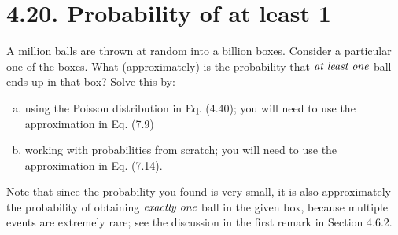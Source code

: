\section*{4.20. Probability of at least 1}
A million balls are thrown at random into a billion boxes.
Consider a particular one of the boxes. What (approximately)
is the probability that $\emph{at least one}$ ball ends
up in that box? Solve this by:
\begin{enumerate}[(a)]
    \item using the Poisson distribution in Eq. (4.40); you will
        need to use the approximation in Eq. (7.9)

    \item working with probabilities from scratch; you will need
        to use the approximation in Eq. (7.14).
\end{enumerate}
Note that since the probability you found is very small, it is
also approximately the probability of obtaining $\emph{exactly one}$ 
ball in the given box, because multiple events are extremely rare;
see the discussion in the first remark in Section 4.6.2.

\vspace{1em}


